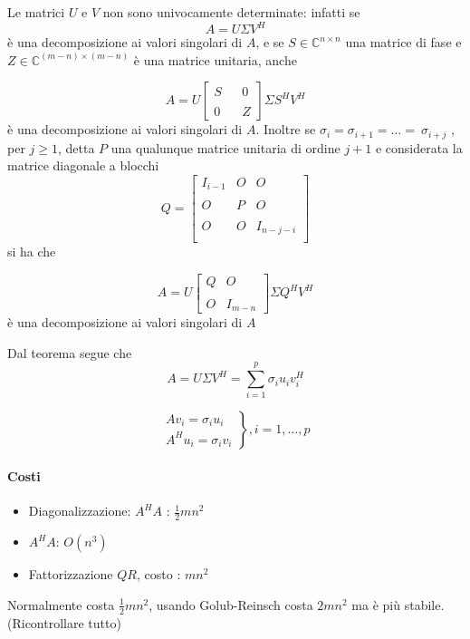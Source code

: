 \begin{thproof}
Le matrici $U$ e $V$ non sono univocamente determinate: infatti se
$$ A = U \Sigma V^{H}$$
\`e una decomposizione ai valori singolari di $A$, e se $S \in
\mathbb{C}^{n \times n}$ una matrice di fase e $Z \in
\mathbb{C}^{(m-n) \times (m-n)}$ \`e una matrice unitaria, anche

$$
A = U \left[
\begin{array}{ccc} S & & 0\\ & & \\ 0 & & Z
\end{array} \right] \Sigma S^{H}V^{H}
$$
\`e una decomposizione ai valori singolari di $A$.  Inoltre se
$\sigma_i = \sigma_{i+1} = \ldots = \ \sigma_{i+j}$ , per $j \geq 1$,
detta $P$ una qualunque matrice unitaria di ordine $j + 1$ e
considerata la matrice diagonale a blocchi
$$
Q= \left[
\begin{array}{ccc} I_{i-1} & O & O \\ & & \\ O & P & O \\ & & \\ O & O
& I_{n-j-i} \\
\end{array} \right]
$$
si ha che

$$
A= U \left[
\begin{array}{cc} Q & O \\ & \\ O & I_{m-n}
\end{array} \right] \Sigma Q^{H}V^{H}
$$
\`e una decomposizione ai valori singolari di $A$
\end{thproof} Dal teorema segue che
\begin{equation}
  \label{eq:06minq13} A = U\Sigma V^{H} = \displaystyle \sum_{i=1}^{p}
\sigma_i u_i v_i^{H}
\end{equation}

$$
\left.
\begin{array}{c} Av_i = \sigma_i u_i \\ A^{H} u_i = \sigma_i v_i
\end{array} \right\}, i=1,\ldots, p
$$
\begin{workinprogress}
\paragraph{Costi}
\begin{itemize}
 \item  Diagonalizzazione: $A^{H}A$ : $\frac{1}{2}mn^{2}$
 \item $A^{H}A$: $O(n^{3})$
 \item  Fattorizzazione $QR$, costo : $mn^{2}$
\end{itemize}
Normalmente costa $\frac{1}{2} mn^{2}$, usando Golub-Reinsch costa $2mn^{2}$
ma \`e più stabile. (Ricontrollare tutto)  
\end{workinprogress}

